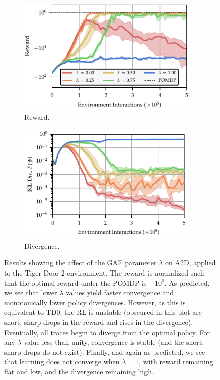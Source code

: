 \begin{figure}[t]

    \begin{subfigure}[t]{0.48\textwidth}
        \includegraphics[width=0.95\textwidth]{figures/OSC/lambda_sweep/lam_sweep_results_TigerDoor_True_tests_results_AdaptAsymDagger_cr_logs_lam_sweep_4_.pdf}
        \caption{Reward.}
        \label{fig:osc:lambda:reward}
    \end{subfigure}%
    \hfill%
    \begin{subfigure}[t]{0.48\textwidth}
        \includegraphics[width=0.95\textwidth]{figures/OSC/lambda_sweep/lam_sweep_divergence_TigerDoor_True_tests_results_AdaptAsymDagger_cr_logs_lam_sweep_4_.pdf}
        \caption{Divergence.}
        \label{fig:osc:lambda:divergence}
    \end{subfigure}%
    \vspace{-0.25cm}
    \caption{Results showing the affect of the GAE parameter $\lambda$ on A2D, applied to the  Tiger Door 2 environment.  The reward is normalized such that the optimal reward under the POMDP is $-10^{0}$.  As predicted, we see that lower $\lambda$ values yield faster convergence and monotonically lower policy divergences.  However, as this is equivalent to TD0, the RL is unstable (obscured in this plot are short, sharp drops in the reward and rises in the divergence).  Eventually, all traces begin to diverge from the optimal policy.  For any $\lambda$ value less than unity, convergence is stable (and the short, sharp drops do not exist).  Finally, and again as predicted, we see that learning does not converge when $\lambda = 1$, with reward remaining flat and low, and the divergence remaining high. { }%
    }
    \label{fig:osc:lambda}
\end{figure}
